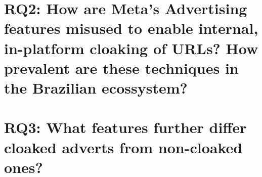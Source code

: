 \section{RQ2: How are Meta's Advertising features misused to enable internal, in-platform cloaking of URLs? How prevalent are these techniques in the Brazilian ecossystem?}


\section{RQ3: What features further differ cloaked adverts from non-cloaked ones?}






